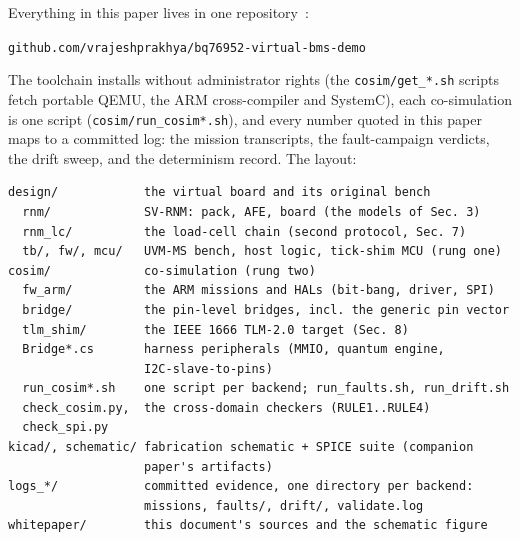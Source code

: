 \documentclass[11pt]{article}
\begin{document}
Everything in this paper lives in one repository~\cite{repo}:

\begin{center}
\texttt{github.com/vrajeshprakhya/bq76952-virtual-bms-demo}
\end{center}

The toolchain installs without administrator rights (the
\texttt{cosim/get\_*.sh} scripts fetch portable QEMU, the ARM
cross-compiler and SystemC), each co-simulation is one script
(\texttt{cosim/run\_cosim*.sh}), and every number quoted in this
paper maps to a committed log: the mission transcripts, the
fault-campaign verdicts, the drift sweep, and the determinism
record.  The layout:

{\small
\begin{verbatim}
design/            the virtual board and its original bench
  rnm/             SV-RNM: pack, AFE, board (the models of Sec. 3)
  rnm_lc/          the load-cell chain (second protocol, Sec. 7)
  tb/, fw/, mcu/   UVM-MS bench, host logic, tick-shim MCU (rung one)
cosim/             co-simulation (rung two)
  fw_arm/          the ARM missions and HALs (bit-bang, driver, SPI)
  bridge/          the pin-level bridges, incl. the generic pin vector
  tlm_shim/        the IEEE 1666 TLM-2.0 target (Sec. 8)
  Bridge*.cs       harness peripherals (MMIO, quantum engine,
                   I2C-slave-to-pins)
  run_cosim*.sh    one script per backend; run_faults.sh, run_drift.sh
  check_cosim.py,  the cross-domain checkers (RULE1..RULE4)
  check_spi.py
kicad/, schematic/ fabrication schematic + SPICE suite (companion
                   paper's artifacts)
logs_*/            committed evidence, one directory per backend:
                   missions, faults/, drift/, validate.log
whitepaper/        this document's sources and the schematic figure
\end{verbatim}
}
\end{document}
